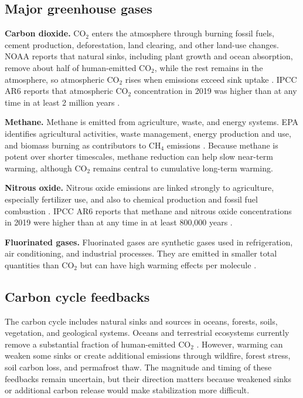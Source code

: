 \documentclass[12pt]{article}
\begin{document}
\subsection{Major greenhouse gases}

\textbf{Carbon dioxide.} CO$_2$ enters the atmosphere through burning fossil fuels, cement production, deforestation, land clearing, and other land-use changes. NOAA reports that natural sinks, including plant growth and ocean absorption, remove about half of human-emitted CO$_2$, while the rest remains in the atmosphere, so atmospheric CO$_2$ rises when emissions exceed sink uptake \cite{ref3}. IPCC AR6 reports that atmospheric CO$_2$ concentration in 2019 was higher than at any time in at least 2 million years \cite{ref1}.

\textbf{Methane.} Methane is emitted from agriculture, waste, and energy systems. EPA identifies agricultural activities, waste management, energy production and use, and biomass burning as contributors to CH$_4$ emissions \cite{ref4}. Because methane is potent over shorter timescales, methane reduction can help slow near-term warming, although CO$_2$ remains central to cumulative long-term warming.

\textbf{Nitrous oxide.} Nitrous oxide emissions are linked strongly to agriculture, especially fertilizer use, and also to chemical production and fossil fuel combustion \cite{ref4}. IPCC AR6 reports that methane and nitrous oxide concentrations in 2019 were higher than at any time in at least 800,000 years \cite{ref1}.

\textbf{Fluorinated gases.} Fluorinated gases are synthetic gases used in refrigeration, air conditioning, and industrial processes. They are emitted in smaller total quantities than CO$_2$ but can have high warming effects per molecule \cite{ref4}.

\subsection{Carbon cycle feedbacks}

The carbon cycle includes natural sinks and sources in oceans, forests, soils, vegetation, and geological systems. Oceans and terrestrial ecosystems currently remove a substantial fraction of human-emitted CO$_2$ \cite{ref3}. However, warming can weaken some sinks or create additional emissions through wildfire, forest stress, soil carbon loss, and permafrost thaw. The magnitude and timing of these feedbacks remain uncertain, but their direction matters because weakened sinks or additional carbon release would make stabilization more difficult.
\end{document}
